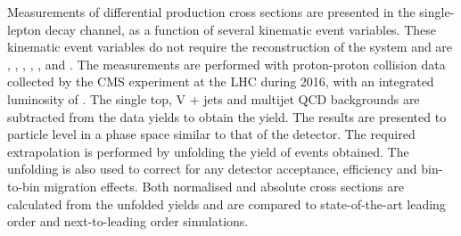 Measurements of differential \ttbar{} production cross sections are presented in the single-lepton decay channel, as a function of several kinematic event variables.
These kinematic event variables do not require the reconstruction of the \ttbar{} system and are \NJET{}, \HT{}, \ST{}, \ptmiss{}, \WPT{}, \LPT{} and \LETA{}.
The measurements are performed with proton-proton collision data collected by the CMS experiment at the LHC during 2016, with an integrated luminosity of \Lumi{}.
The single top, V + jets and multijet QCD backgrounds are subtracted from the data yields to obtain the \ttbar{} yield.
The results are presented to particle level in a phase space similar to that of the detector.
The required extrapolation is performed by unfolding the yield of \ttbar{} events obtained.
The unfolding is also used to correct for any detector acceptance, efficiency and bin-to-bin migration effects.
Both normalised and absolute cross sections are calculated from the unfolded \ttbar{} yields and are compared to state-of-the-art leading order and next-to-leading order \ttbar{} simulations.
\clearpage

\newpage\null\thispagestyle{empty}
\tableofcontents

\newpage\null\thispagestyle{empty}
\listoffigures
\newpage\null\thispagestyle{empty}
\listoftables
\clearpage




